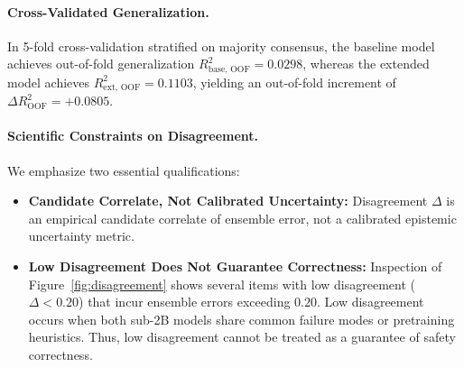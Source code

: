 \paragraph{Cross-Validated Generalization.}
In 5-fold cross-validation stratified on majority consensus, the baseline model achieves out-of-fold generalization $R^2_{\text{base, OOF}} = 0.0298$, whereas the extended model achieves $R^2_{\text{ext, OOF}} = 0.1103$, yielding an out-of-fold increment of $\Delta R^2_{\text{OOF}} = +0.0805$.

\paragraph{Scientific Constraints on Disagreement.}
We emphasize two essential qualifications:
\begin{itemize}
    \item \textbf{Candidate Correlate, Not Calibrated Uncertainty:} Disagreement $\Delta$ is an empirical candidate correlate of ensemble error, not a calibrated epistemic uncertainty metric.
    \item \textbf{Low Disagreement Does Not Guarantee Correctness:} Inspection of Figure~\ref{fig:disagreement} shows several items with low disagreement ($\Delta < 0.20$) that incur ensemble errors exceeding $0.20$. Low disagreement occurs when both sub-2B models share common failure modes or pretraining heuristics. Thus, low disagreement cannot be treated as a guarantee of safety correctness.
\end{itemize}
